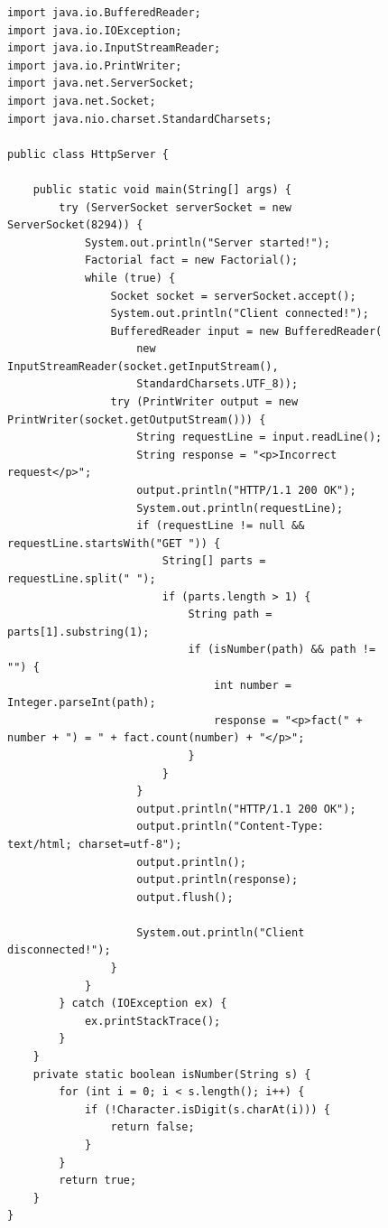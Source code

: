 \documentclass[a4paper, 14pt]{extarticle}
\begin{document}
\begin{figure}[!htb]
\begin{lstlisting}[caption={Сервер из примера с модификацией}, label={lst:code3}, linewidth=17.6cm, xleftmargin=-0.5cm]
import java.io.BufferedReader;
import java.io.IOException;
import java.io.InputStreamReader;
import java.io.PrintWriter;
import java.net.ServerSocket;
import java.net.Socket;
import java.nio.charset.StandardCharsets;

public class HttpServer {

    public static void main(String[] args) {
        try (ServerSocket serverSocket = new ServerSocket(8294)) {
            System.out.println("Server started!");
            Factorial fact = new Factorial();
            while (true) {
                Socket socket = serverSocket.accept();
                System.out.println("Client connected!");
                BufferedReader input = new BufferedReader(
                    new InputStreamReader(socket.getInputStream(), 
                    StandardCharsets.UTF_8));
                try (PrintWriter output = new PrintWriter(socket.getOutputStream())) {
                    String requestLine = input.readLine();
                    String response = "<p>Incorrect request</p>";
                    output.println("HTTP/1.1 200 OK");
                    System.out.println(requestLine);
                    if (requestLine != null && requestLine.startsWith("GET ")) {
                        String[] parts = requestLine.split(" ");
                        if (parts.length > 1) {
                            String path = parts[1].substring(1);
                            if (isNumber(path) && path != "") {
                                int number = Integer.parseInt(path);
                                response = "<p>fact(" + number + ") = " + fact.count(number) + "</p>";
                            }
                        }
                    }
                    output.println("HTTP/1.1 200 OK");
                    output.println("Content-Type: text/html; charset=utf-8");
                    output.println();
                    output.println(response);
                    output.flush();
                
                    System.out.println("Client disconnected!");
                }
            }
        } catch (IOException ex) {
            ex.printStackTrace();
        }
    }
    private static boolean isNumber(String s) {
        for (int i = 0; i < s.length(); i++) {
            if (!Character.isDigit(s.charAt(i))) {
                return false;
            }
        }
        return true;
    }
}
\end{lstlisting}
\end{figure}
\end{document}
